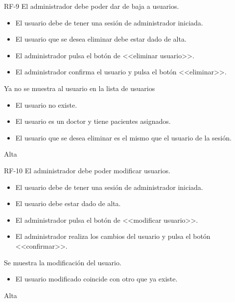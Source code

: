 {RF-9}
{El administrador debe poder dar de baja a usuarios.}
{	\begin{itemize}
	\def\labelenumi{\arabic{enumi}.}
	\tightlist
	\item El usuario debe de tener una sesión de administrador iniciada.
	\item El usuario que se desea eliminar debe estar dado de alta.
	\end{itemize}}
{
	\begin{itemize}
	\def\labelenumi{\arabic{enumi}.}
	\tightlist
    \item El administrador pulsa el botón de <<eliminar usuario>>.
    \item El administrador confirma el usuario y pulsa el botón <<eliminar>>.
    \end{itemize}
}
{Ya no se muestra al usuario en la lista de usuarios}
{\begin{itemize}
	\def\labelenumi{\arabic{enumi}.}
	\tightlist
    \item El usuario no existe.
    \item El usuario es un doctor y tiene pacientes asignados.
    \item El usuario que se desea eliminar es el mismo que el usuario de la sesión.
    \end{itemize}}
{Alta}

{RF-10}
{El administrador debe poder modificar usuarios.}
{	\begin{itemize}
	\def\labelenumi{\arabic{enumi}.}
	\tightlist
	\item El usuario debe de tener una sesión de administrador iniciada.
	\item El usuario debe estar dado de alta.
	\end{itemize}}
{
	\begin{itemize}
	\def\labelenumi{\arabic{enumi}.}
	\tightlist

    \item El administrador pulsa el botón de <<modificar usuario>>.
    \item El administrador realiza los cambios del usuario y pulsa el botón <<confirmar>>.
    \end{itemize}
}
{Se muestra la modificación del usuario.}
{\begin{itemize}
	\def\labelenumi{\arabic{enumi}.}
	\tightlist
    \item El usuario modificado coincide con otro que ya existe.
    \end{itemize}}
{Alta}

